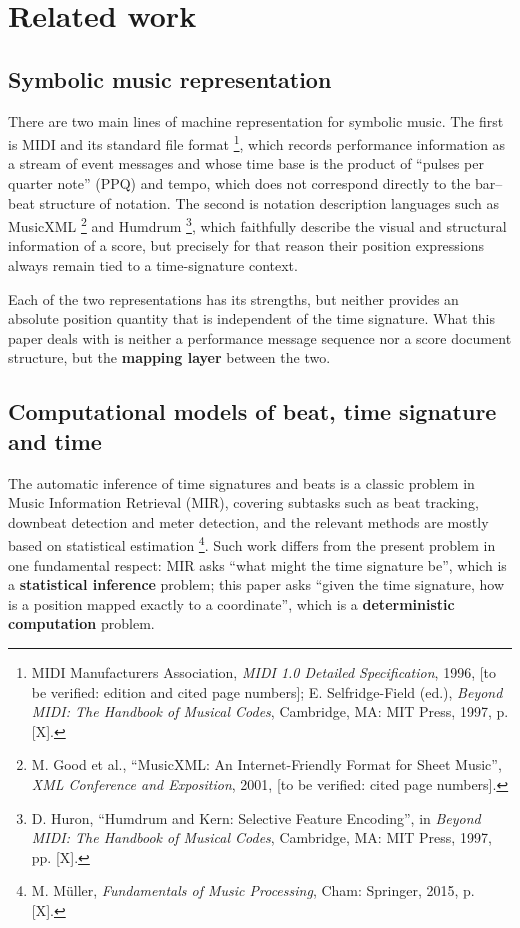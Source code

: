 \documentclass[11pt,a4paper]{article}
\begin{document}
\section{Related work}
\label{sec:related}
\subsection{Symbolic music representation}

There are two main lines of machine representation for symbolic music. The first is
MIDI and its standard file format
\footnote{MIDI Manufacturers Association, \emph{MIDI 1.0 Detailed Specification}, 1996, [to be verified: edition and cited page numbers]; E. Selfridge-Field (ed.), \emph{Beyond MIDI: The Handbook of Musical Codes}, Cambridge, MA: MIT Press, 1997, p. [X].}, which records performance information as a stream of event messages and whose time base is the product of ``pulses per quarter note'' (PPQ) and tempo, which does not correspond directly to the bar--beat structure of notation. The second is notation description languages such as MusicXML \footnote{M. Good et al., ``MusicXML: An Internet-Friendly Format for Sheet Music'', \emph{XML Conference and Exposition}, 2001, [to be verified: cited page numbers].} and Humdrum
\footnote{D. Huron, ``Humdrum and Kern: Selective Feature Encoding'', in \emph{Beyond MIDI: The Handbook of Musical Codes}, Cambridge, MA: MIT Press, 1997, pp. [X].}, which faithfully describe the visual and structural information of a score, but precisely for that reason their position expressions always remain tied to a time-signature context.

\begin{remark}
Each of the two representations has its strengths, but neither provides an absolute
position quantity that is independent of the time signature. What this paper deals with
is neither a performance message sequence nor a score document structure, but the
\textbf{mapping layer} between the two.
\end{remark}

\subsection{Computational models of beat, time signature and time}

The automatic inference of time signatures and beats is a classic problem in Music
Information Retrieval (MIR), covering subtasks such as beat tracking, downbeat
detection and meter detection, and the relevant methods are mostly based on statistical
estimation \footnote{M. Müller, \emph{Fundamentals of Music Processing}, Cham: Springer, 2015, p. [X].}. Such work differs from the present problem in one fundamental respect: MIR asks
``what might the time signature be'', which is a \textbf{statistical inference}
problem; this paper asks ``given the time signature, how is a position mapped exactly
to a coordinate'', which is a \textbf{deterministic computation} problem.
\end{document}
